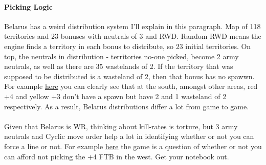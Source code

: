 \paragraph{Picking Logic}

Belarus has a weird distribution system I'll explain in this paragraph. Map of 118 territories and 23 bonuses with neutrals of 3 and RWD. Random RWD means the engine finds a territory in each bonus to distribute, so 23 initial territories. On top, the neutrals in distribution - territories no-one picked, become 2 army neutrals, as well as there are 35 wastelands of 2. If the territory that was supposed to be distributed is a wasteland of 2, then that bonus has no spawwn. For example \href{https://www.warzone.com/MultiPlayer?GameID=40269350}{here} you can clearly see that at the south, amongst other areas, red +4 and yellow +3 don't have a spawn but have 2 and 1 wasteland of 2 respectively. As a result, Belarus distributions differ a lot from game to game.
\\
\\
Given that Belarus is WR, thinking about kill-rates is torture, but 3 army neutrals and Cyclic move order help a lot in identifying whether or not you can force a line or not. For example \href{https://www.warzone.com/MultiPlayer?GameID=34663752}{here} the game is a question of whether or not you can afford not picking the +4 FTB in the west. Get your notebook out.
